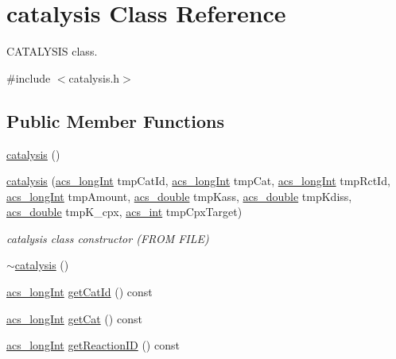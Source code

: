\hypertarget{a00009}{\section{catalysis Class Reference}
\label{a00009}
}


C\-A\-T\-A\-L\-Y\-S\-I\-S class.  




{\ttfamily \#include $<$catalysis.\-h$>$}

\subsection*{Public Member Functions}
\begin{DoxyCompactItemize}
\item 
\hyperlink{a00009_a7c4d1a67d2745293a17a6bee0df7c5cd}{catalysis} ()
\item 
\hyperlink{a00009_ab6af429c051e2bc9756bac72b99cc4ce}{catalysis} (\hyperlink{a00024_a19319d75f02db4308bc5c0026d98cd85}{acs\-\_\-long\-Int} tmp\-Cat\-Id, \hyperlink{a00024_a19319d75f02db4308bc5c0026d98cd85}{acs\-\_\-long\-Int} tmp\-Cat, \hyperlink{a00024_a19319d75f02db4308bc5c0026d98cd85}{acs\-\_\-long\-Int} tmp\-Rct\-Id, \hyperlink{a00024_a19319d75f02db4308bc5c0026d98cd85}{acs\-\_\-long\-Int} tmp\-Amount, \hyperlink{a00024_ab776853a005fcbf56af0424a2a4dd607}{acs\-\_\-double} tmp\-Kass, \hyperlink{a00024_ab776853a005fcbf56af0424a2a4dd607}{acs\-\_\-double} tmp\-Kdiss, \hyperlink{a00024_ab776853a005fcbf56af0424a2a4dd607}{acs\-\_\-double} tmp\-K\-\_\-cpx, \hyperlink{a00024_a8d277355641a098190360234e2ebde35}{acs\-\_\-int} tmp\-Cpx\-Target)
\begin{DoxyCompactList}\small\item\em catalysis class constructor (F\-R\-O\-M F\-I\-L\-E) \end{DoxyCompactList}\item 
\hyperlink{a00009_a982805165c59e95ac055dc24e684fa05}{$\sim$catalysis} ()
\item 
\hyperlink{a00024_a19319d75f02db4308bc5c0026d98cd85}{acs\-\_\-long\-Int} \hyperlink{a00009_a85ba5bd9c758392f245f1277141a1706}{get\-Cat\-Id} () const 
\item 
\hyperlink{a00024_a19319d75f02db4308bc5c0026d98cd85}{acs\-\_\-long\-Int} \hyperlink{a00009_a205e222dff1e80ff8f3195ab22e78726}{get\-Cat} () const 
\item 
\hyperlink{a00024_a19319d75f02db4308bc5c0026d98cd85}{acs\-\_\-long\-Int} \hyperlink{a00009_a6e0eea2f12109b36bb522ac971d1db29}{get\-Reaction\-I\-D} () const 

\end{DoxyCompactItemize}
